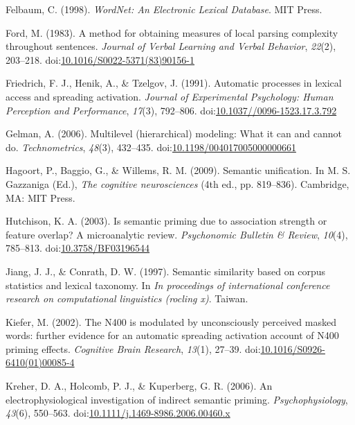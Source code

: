 \documentclass[english,man]{apa6}
\theoremstyle{definition}
\theoremstyle{definition}
\theoremstyle{definition}
\theoremstyle{remark}
\begin{document}
\hypertarget{ref-Felbaum1998}{}
Felbaum, C. (1998). \emph{WordNet: An Electronic Lexical Database}. MIT
Press.

\hypertarget{ref-Ford1983}{}
Ford, M. (1983). A method for obtaining measures of local parsing
complexity throughout sentences. \emph{Journal of Verbal Learning and
Verbal Behavior}, \emph{22}(2), 203--218.
doi:\href{https://doi.org/10.1016/S0022-5371(83)90156-1}{10.1016/S0022-5371(83)90156-1}

\hypertarget{ref-Friedrich1991}{}
Friedrich, F. J., Henik, A., \& Tzelgov, J. (1991). Automatic processes
in lexical access and spreading activation. \emph{Journal of
Experimental Psychology: Human Perception and Performance},
\emph{17}(3), 792--806.
doi:\href{https://doi.org/10.1037//0096-1523.17.3.792}{10.1037//0096-1523.17.3.792}

\hypertarget{ref-Gelman2006}{}
Gelman, A. (2006). Multilevel (hierarchical) modeling: What it can and
cannot do. \emph{Technometrics}, \emph{48}(3), 432--435.
doi:\href{https://doi.org/10.1198/004017005000000661}{10.1198/004017005000000661}

\hypertarget{ref-Hagoort2009}{}
Hagoort, P., Baggio, G., \& Willems, R. M. (2009). Semantic unification.
In M. S. Gazzaniga (Ed.), \emph{The cognitive neurosciences} (4th ed.,
pp. 819--836). Cambridge, MA: MIT Press.

\hypertarget{ref-Hutchison2003}{}
Hutchison, K. A. (2003). Is semantic priming due to association strength
or feature overlap? A microanalytic review. \emph{Psychonomic Bulletin
\& Review}, \emph{10}(4), 785--813.
doi:\href{https://doi.org/10.3758/BF03196544}{10.3758/BF03196544}

\hypertarget{ref-Jiang1997}{}
Jiang, J. J., \& Conrath, D. W. (1997). Semantic similarity based on
corpus statistics and lexical taxonomy. In \emph{In proceedings of
international conference research on computational linguistics (rocling
x)}. Taiwan.

\hypertarget{ref-Kiefer2002}{}
Kiefer, M. (2002). The N400 is modulated by unconsciously perceived
masked words: further evidence for an automatic spreading activation
account of N400 priming effects. \emph{Cognitive Brain Research},
\emph{13}(1), 27--39.
doi:\href{https://doi.org/10.1016/S0926-6410(01)00085-4}{10.1016/S0926-6410(01)00085-4}

\hypertarget{ref-Kreher2006}{}
Kreher, D. A., Holcomb, P. J., \& Kuperberg, G. R. (2006). An
electrophysiological investigation of indirect semantic priming.
\emph{Psychophysiology}, \emph{43}(6), 550--563.
doi:\href{https://doi.org/10.1111/j.1469-8986.2006.00460.x}{10.1111/j.1469-8986.2006.00460.x}
\end{document}

